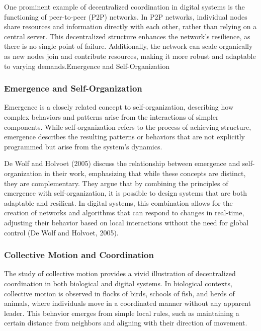 \documentclass[12pt,twoside]{article}
\begin{document}
One prominent example of decentralized coordination in digital systems is the functioning of peer-to-peer (P2P) networks. In P2P networks, individual nodes share resources and information directly with each other, rather than relying on a central server. This decentralized structure enhances the network's resilience, as there is no single point of failure. Additionally, the network can scale organically as new nodes join and contribute resources, making it more robust and adaptable to varying demands.Emergence and Self-Organization

\subsubsection{Emergence and Self-Organization}

Emergence is a closely related concept to self-organization, describing how complex behaviors and patterns arise from the interactions of simpler components. While self-organization refers to the process of achieving structure, emergence describes the resulting patterns or behaviors that are not explicitly programmed but arise from the system's dynamics.

De Wolf and Holvoet (2005) discuss the relationship between emergence and self-organization in their work, emphasizing that while these concepts are distinct, they are complementary. They argue that by combining the principles of emergence with self-organization, it is possible to design systems that are both adaptable and resilient. In digital systems, this combination allows for the creation of networks and algorithms that can respond to changes in real-time, adjusting their behavior based on local interactions without the need for global control (De Wolf and Holvoet, 2005).

\subsubsection{Collective Motion and Coordination}

The study of collective motion provides a vivid illustration of decentralized coordination in both biological and digital systems. In biological contexts, collective motion is observed in flocks of birds, schools of fish, and herds of animals, where individuals move in a coordinated manner without any apparent leader. This behavior emerges from simple local rules, such as maintaining a certain distance from neighbors and aligning with their direction of movement.
\end{document}
